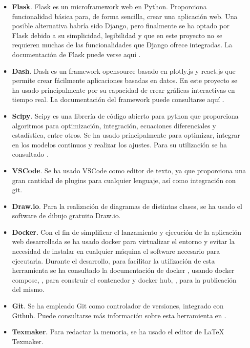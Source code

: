 \begin{itemize}
\item \textbf{Flask}. Flask es un microframework web en Python. Proporciona funcionalidad básica para, de forma sencilla, crear una aplicación web. Una posible alternativa habría sido Django, pero finalmente se ha optado por Flask debido a su simplicidad, legibilidad y que en este proyecto no se requieren muchas de las funcionalidades que Django ofrece integradas. La documentación de Flask puede verse aquí \cite{flask}.
\item \textbf{Dash}. Dash es un framework opensource basado en plotly.js y react.js que permite crear fácilmente aplicaciones basadas en datos. En este proyecto se ha usado principalmente por su capacidad de crear gráficas interactivas en tiempo real. La documentación del framework puede consultarse aquí \cite{dash}.
\item \textbf{Scipy}. Scipy es una librería de código abierto para python que proporciona algoritmos para optimización, integración, ecuaciones diferenciales y estadística, entre otros. Se ha usado principalmente para optimizar, integrar en los modelos continuos y realizar los ajustes. Para su utilización se ha consultado \cite{scipy}.
\item \textbf{VSCode}. Se ha usado VSCode como editor de texto, ya que proporciona una gran cantidad de plugins para cualquier lenguaje, así como integración con git.
\item \textbf{Draw.io}. Para la realización de diagramas de distintas clases, se ha usado el software de dibujo gratuito Draw.io.
\item \textbf{Docker}. Con el fin de simplificar el lanzamiento y ejecución de la aplicación web desarrollada se ha usado docker para virtualizar el entorno y evitar la necesidad de instalar en cualquier máquina el software necesario para ejecutarla. Durante el desarrollo, para facilitar la utilización de esta herramienta se ha consultado la documentación de docker \cite{docker}, usando docker compose, \cite{dockercompose}, para construir el contenedor y docker hub, \cite{dockerhub}, para la publicación del mismo.
\item \textbf{Git}. Se ha empleado Git como controlador de versiones, integrado con Github. Puede consultarse más información sobre esta herramienta en \cite{git}.
\item \textbf{Texmaker}. Para redactar la memoria, se ha usado el editor de LaTeX Texmaker.
\end{itemize}

